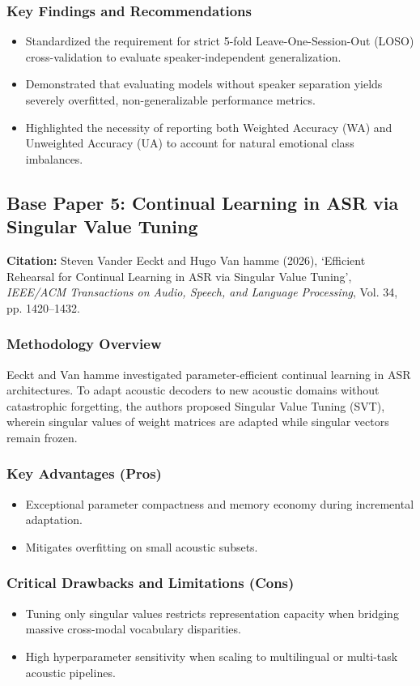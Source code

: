 \subsubsection{Key Findings and Recommendations}
\begin{itemize}
    \item Standardized the requirement for strict 5-fold Leave-One-Session-Out (LOSO) cross-validation to evaluate speaker-independent generalization.
    \item Demonstrated that evaluating models without speaker separation yields severely overfitted, non-generalizable performance metrics.
    \item Highlighted the necessity of reporting both Weighted Accuracy (WA) and Unweighted Accuracy (UA) to account for natural emotional class imbalances.
\end{itemize}

\subsection{Base Paper 5: Continual Learning in ASR via Singular Value Tuning}
\textbf{Citation:} Steven Vander Eeckt and Hugo Van hamme (2026), `Efficient Rehearsal for Continual Learning in ASR via Singular Value Tuning', \textit{IEEE/ACM Transactions on Audio, Speech, and Language Processing}, Vol. 34, pp. 1420--1432.

\subsubsection{Methodology Overview}
Eeckt and Van hamme investigated parameter-efficient continual learning in ASR architectures. To adapt acoustic decoders to new acoustic domains without catastrophic forgetting, the authors proposed Singular Value Tuning (SVT), wherein singular values of weight matrices are adapted while singular vectors remain frozen.

\subsubsection{Key Advantages (Pros)}
\begin{itemize}
    \item Exceptional parameter compactness and memory economy during incremental adaptation.
    \item Mitigates overfitting on small acoustic subsets.
\end{itemize}

\subsubsection{Critical Drawbacks and Limitations (Cons)}
\begin{itemize}
    \item Tuning only singular values restricts representation capacity when bridging massive cross-modal vocabulary disparities.
    \item High hyperparameter sensitivity when scaling to multilingual or multi-task acoustic pipelines.
\end{itemize}


